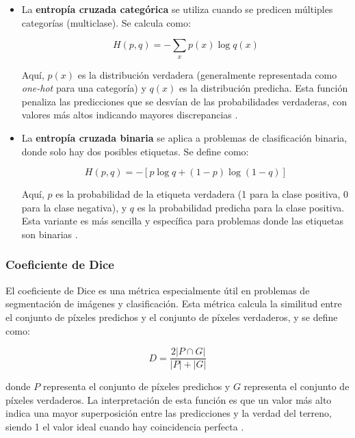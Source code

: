 \begin{itemize}
	\item La \textbf{entropía cruzada categórica} se utiliza cuando se predicen múltiples categorías (multiclase). Se calcula como:

	\begin{equation}
    		H(p, q) = -\sum_{x} p(x) \log q(x)
	\end{equation}

	Aquí, \(p(x)\) es la distribución verdadera (generalmente representada como \textit{one-hot} para una categoría) y \(q(x)\) es la distribución predicha. Esta función penaliza las predicciones que se desvían de las probabilidades verdaderas, con valores más altos indicando mayores discrepancias \citep{pajares2021aprendizaje}. 

	\item La\textbf{ entropía cruzada binaria} se aplica a problemas de clasificación binaria, donde solo hay dos posibles etiquetas. Se define como:

	\begin{equation}
    		H(p, q) = - \left[ p \log q + (1 - p) \log (1 - q) \right]
	\end{equation}

	Aquí, \(p\) es la probabilidad de la etiqueta verdadera (1 para la clase positiva, 0 para la clase negativa), y \(q\) es la probabilidad predicha para la clase positiva. Esta variante es más sencilla y específica para problemas donde las etiquetas son binarias \citep{pajares2021aprendizaje}.
\end{itemize}



\subsubsection{Coeficiente de Dice}

El coeficiente de Dice es una métrica especialmente útil en problemas de segmentación de imágenes y clasificación. Esta métrica calcula la similitud entre el conjunto de píxeles predichos y el conjunto de píxeles verdaderos, y se define como:

\begin{equation}
    D = \frac{2 |P \cap G|}{|P| + |G|}
\end{equation}

donde \(P\) representa el conjunto de píxeles predichos y \(G\) representa el conjunto de píxeles verdaderos. La interpretación de esta función es que un valor más alto indica una mayor superposición entre las predicciones y la verdad del terreno, siendo 1 el valor ideal cuando hay coincidencia perfecta \cite{pajares2021aprendizaje}.

